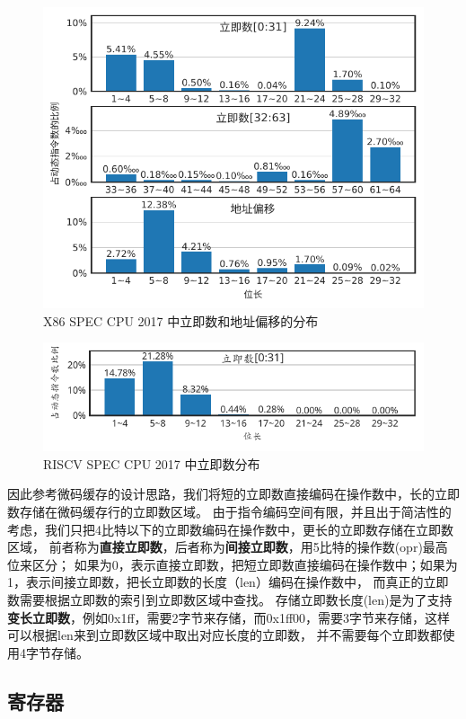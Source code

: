 \begin{figure}[h]
  \centering
  \includegraphics[width=0.8\linewidth]{./plot/immsize_x86.pdf}
  \caption{X86 SPEC CPU 2017 中立即数和地址偏移的分布}
  \label{img:immsize_x86}
\end{figure}

\begin{figure}[h]
  \centering
  \includegraphics[width=0.8\linewidth]{./plot/immsize_riscv.pdf}
  \caption{RISCV SPEC CPU 2017 中立即数分布}
  \label{img:immsize_riscv}
\end{figure}

因此参考微码缓存的设计思路，我们将短的立即数直接编码在操作数中，长的立即数存储在微码缓存行的立即数区域。
由于指令编码空间有限，并且出于简洁性的考虑，我们只把4比特以下的立即数编码在操作数中，更长的立即数存储在立即数区域，
前者称为\textbf{直接立即数}，后者称为\textbf{间接立即数}，用5比特的操作数(opr)最高位来区分；
如果为0，表示直接立即数，把短立即数直接编码在操作数中；如果为1，表示间接立即数，把长立即数的长度（len）编码在操作数中，
而真正的立即数需要根据立即数的索引到立即数区域中查找。
存储立即数长度(len)是为了支持\textbf{变长立即数}，例如0x1ff，需要2字节来存储，而0x1ff00，需要3字节来存储，这样可以根据len来到立即数区域中取出对应长度的立即数，
并不需要每个立即数都使用4字节存储。


\subsection{寄存器}

